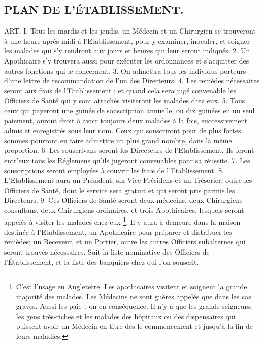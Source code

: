 \subsection{PLAN DE L'ÉTABLISSEMENT.}
ART. I. Tous les mardis et les jeudis, un Médecin et un Chirurgien se trouveront à une heure après midi à l'Etablissement, pour y examiner, inoculer, et soigner les malades qui s'y rendront aux jours et heures qui leur seront indiqués.
2. Un Apothicaire s'y trouvera aussi pour exécuter les ordonnances et s'acquitter des autres fonctions qui le concernent.
3. On admettra tous les individus porteurs d'une lettre de recommandation de l'un des Directeurs.
4. Les remèdes nécessaires seront aux frais de l'Etablissement ; et quand cela sera jugé convenable les Officiers de Santé qui y sont attachés visiteront les malades chez eux.
5. Tous ceux qui payeront une guinée de souscription annuelle, ou dix guinées en un seul paiement, auront droit à avoir toujours deux malades à la fois, successivement admis et enregistrés sous leur nom. Ceux qui souscriront pour de plus fortes sommes pourront en faire admettre un plus grand nombre, dans la même proportion.
\setcounter{page}{274}
6. Les souscrivans seront les Directeurs de l'Etablissement. Ils feront entr'eux tous les Réglemens qu'ils jugeront convenables pour sa réussite.
7. Les souscriptions seront employées à couvrir les frais de l'Etablissement.
8. L'Etablissement aura un Président, six Vice-Présidens et un Trésorier, outre les Officiers de Santé, dont le service sera gratuit et qui seront pris parmis les Directeurs.
9. Ces Officiers de Santé seront deux médecins, deux Chirurgiens consultans, deux Chirurgiens ordinaires, et trois Apothicaires, lesquels seront appelés à visiter les malades chez eux \footnote{C'est l'usage en Angleterre. Les apothicaires visitent et soignent la grande majorité des malades. Les Médecins ne sont guères appelés que dans les cas graves. Aussi les paie-t-on en conséquence. Il n'y a que les grands seigneurs, les gens très-riches et les malades des hôpitaux ou des dispensaires qui puissent avoir un Médecin en titre dès le commencement et jusqu'à la fin de leurs maladies.}.
Il y aura à demeure dans la maison destinée à l'Etablissement, un Apothicaire pour préparer et distribuer les remèdes; un Receveur, et un Portier, outre les autres Officiers subalternes qui seront trouvés nécessaires.
\setcounter{page}{275}
Suit la liste nominative des Officiers de l'Établissement, et la liste des banquiers chez qui l'on souscrit.
